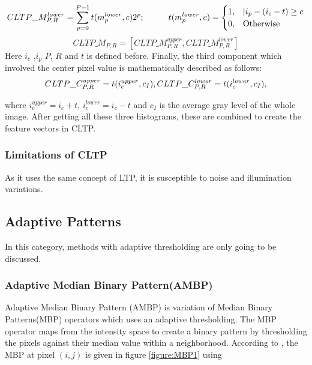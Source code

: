 \documentclass[12pt]{article}
\newcommand\tab[1][1cm]{\hspace*{#1}}
\begin{document}
\begin{equation}
CLTP\_M_{P,R}^{lower} = \sum\limits_{p=0}^{P-1}{t(m_p^{lower},c){{2}^{p}}}; \tab  	t(m_p^{lower},c)= 
\begin{cases}
1,&  |i_p -(i_c - t)\geq c\\
0,&  \text{Otherwise}
\end{cases}
\end{equation}
\begin{equation}
CLTP\_M_{P,R}= [CLTP\_M_{P,R}^{upper},CLTP\_M_{P,R}^{lower}]
\end{equation}
Here $i_c$ ,$i_p$ $P$, $R$ and $t$ is defined before. Finally, the third component which involved the center pixel value is mathematically described as follows:
\begin{equation}
CLTP\_C_{P,R}^{upper} = t(i_c^{upper},c_I),\\
CLTP\_C_{P,R}^{lower} = t(i_c^{lower},c_I),
\end{equation}

where $i_c^{upper} = i_c + t$, $i_c^{lower} = i_c - t$ and $c_I$ is the average gray level of the whole image. After getting all these three histograms, these are combined to create the feature vectors in CLTP.
\subsubsection*{Limitations of CLTP}
As it uses the same concept of LTP, it is susceptible to noise and illumination variations.\\

\subsection{Adaptive Patterns}
In this category, methods with adaptive thresholding are only going to be discussed.
\subsubsection{ Adaptive Median Binary Pattern(AMBP)}
Adaptive Median Binary Pattern (AMBP) is variation of Median Binary Patterns(MBP) operators which uses an adaptive thresholding. The MBP operator maps from the intensity space to create a binary pattern by thresholding the pixels against their median value within a neighborhood. According to \cite{ambp01}, the MBP at pixel $(i,j)$ is given in figure \ref{figure:MBP1} using 
\end{document}
